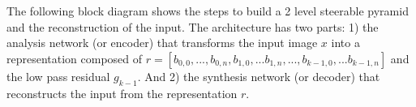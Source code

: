 The following block diagram shows the steps to build a 2 level steerable pyramid and the reconstruction of the input. The architecture has two parts: 1) the analysis network (or encoder) that transforms the input image $x$ into a representation composed of $r=\left[ b_{0,0},...,b_{0,n}, b_{1,0},...b_{1,n},...,b_{k-1,0},...b_{k-1,n} \right]$ and the low pass residual $g_{k-1}$. And 2) the synthesis network (or decoder) that reconstructs the input from the representation $r$.  

